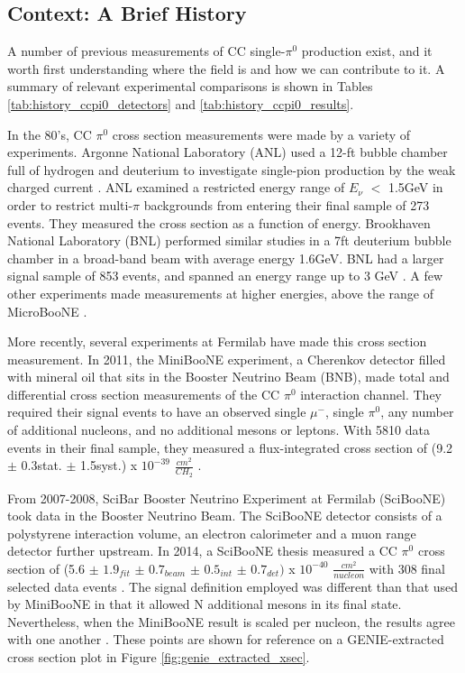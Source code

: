 \subsection{Context: A Brief History}
A number of previous measurements of CC single-$\pi^0$ production exist, and it worth first understanding where the field is and how we can contribute to it. A summary of relevant experimental comparisons is shown in Tables \ref{tab:history_ccpi0_detectors} and \ref{tab:history_ccpi0_results}.
\par In the 80's, CC $\pi^0$ cross section measurements were made by a variety of experiments.  Argonne National Laboratory (ANL) used a 12-ft bubble chamber full of hydrogen and deuterium to investigate single-pion production by the weak charged current \cite{bib:ANL1}. ANL examined a restricted energy range of $E_\nu$ $<$ 1.5GeV in order to restrict multi-$\pi$ backgrounds from entering their final sample of 273 events. They measured the cross section as a function of energy. Brookhaven National Laboratory (BNL) performed similar studies in a 7ft deuterium bubble chamber in a broad-band beam with average energy 1.6GeV. BNL had a larger signal sample of 853 events, and spanned an energy range up to 3 GeV \cite{bib:ANL2} \cite{bib:BNL}. A few other experiments made measurements at higher energies, above the range of MicroBooNE \cite{bib:HE_unknown1} \cite{bib:HE_unknown2}.
\par More recently, several experiments at Fermilab have made this cross section measurement. In 2011, the MiniBooNE experiment, a Cherenkov detector filled with mineral oil that sits in the Booster Neutrino Beam (BNB), made total and differential cross section measurements of the CC $\pi^0$ interaction channel. They required their signal events to have an observed single $\mu^-$, single $\pi^0$, any number of additional nucleons, and no additional mesons or leptons. With 5810 data events in their final sample, they measured a flux-integrated cross section of (9.2 $\pm$ 0.3stat. $\pm$ 1.5syst.) x $10^{-39}$ $\frac{cm^2}{CH_2}$ \cite{bib:numucc_miniboone} \cite{bib:miniboone_thesis}.  
\par From 2007-2008, SciBar Booster Neutrino Experiment at Fermilab (SciBooNE) took data in the Booster Neutrino Beam. The SciBooNE detector consists of a polystyrene interaction volume, an electron calorimeter and a muon range detector further upstream.  In 2014, a SciBooNE thesis measured a CC $\pi^0$ cross section of (5.6 $\pm$ $1.9_{fit}$ $\pm$ $0.7_{beam}$ $\pm$ $0.5_{int}$ $\pm$ $0.7_{det})$ x $10^{-40}$ $\frac{cm^2}{nucleon}$ with 308 final selected data events \cite{bib:sciboone_thesis}. The signal definition employed was different than that used by MiniBooNE in that it allowed N additional mesons in its final state.  Nevertheless, when the MiniBooNE result is scaled per nucleon, the results agree with one another .  These points are shown for reference on a GENIE-extracted cross section plot in Figure \ref{fig:genie_extracted_xsec}.  
